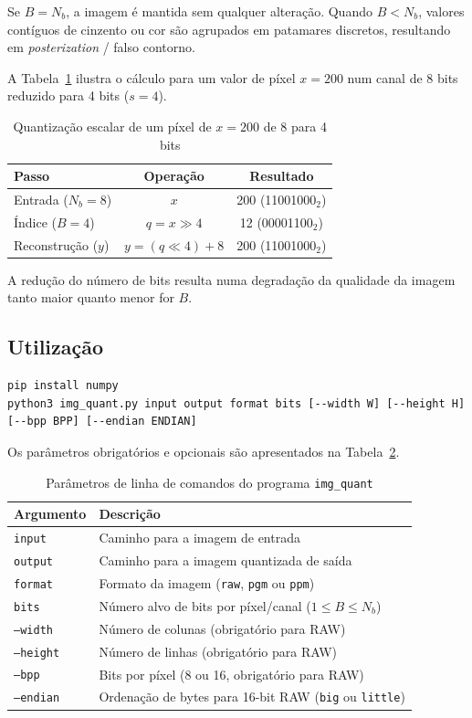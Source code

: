 \documentclass[11pt,a4paper]{report}
\begin{document}
Se $B = N_b$, a imagem é mantida sem qualquer alteração. Quando $B < N_b$, valores contíguos de cinzento ou cor são agrupados em patamares discretos, resultando em \emph{posterization} / falso contorno.

A Tabela~\ref{tab:quant_exemplo} ilustra o cálculo para um valor de píxel $x = 200$ num canal de 8 bits reduzido para 4 bits ($s = 4$).

\begin{table}[H]
\centering
\begin{tabular}{lcc}
\toprule
Passo & Operação & Resultado \\
\midrule
Entrada ($N_b = 8$) & $x$ & 200 (11001000$_2$) \\
Índice ($B = 4$) & $q = x \gg 4$ & 12 (00001100$_2$) \\
Reconstrução ($y$) & $y = (q \ll 4) + 8$ & 200 (11001000$_2$) \\
\bottomrule
\end{tabular}
\caption{Quantização escalar de um píxel de $x = 200$ de 8 para 4 bits}
\label{tab:quant_exemplo}
\end{table}

A redução do número de bits resulta numa degradação da qualidade da imagem tanto maior quanto menor for $B$.

\subsection{Utilização}

\begin{verbatim}
pip install numpy
python3 img_quant.py input output format bits [--width W] [--height H] [--bpp BPP] [--endian ENDIAN]
\end{verbatim}

Os parâmetros obrigatórios e opcionais são apresentados na Tabela~\ref{tab:params_quant}.

\begin{table}[H]
\centering
\begin{tabular}{ll}
\toprule
Argumento & Descrição \\
\midrule
\texttt{input} & Caminho para a imagem de entrada \\
\texttt{output} & Caminho para a imagem quantizada de saída \\
\texttt{format} & Formato da imagem (\texttt{raw}, \texttt{pgm} ou \texttt{ppm}) \\
\texttt{bits} & Número alvo de bits por píxel/canal ($1 \le B \le N_b$) \\
\texttt{--width} & Número de colunas (obrigatório para RAW) \\
\texttt{--height} & Número de linhas (obrigatório para RAW) \\
\texttt{--bpp} & Bits por píxel (8 ou 16, obrigatório para RAW) \\
\texttt{--endian} & Ordenação de bytes para 16-bit RAW (\texttt{big} ou \texttt{little}) \\
\bottomrule
\end{tabular}
\caption{Parâmetros de linha de comandos do programa \texttt{img\_quant}}
\label{tab:params_quant}
\end{table}
\end{document}
